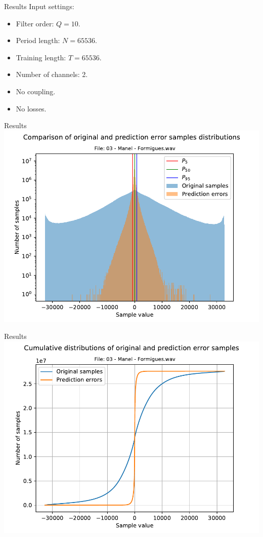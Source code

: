 \documentclass[usenames,dvipsnames]{beamer}
\begin{document}
\begin{frame}{Results}
Input settings:
\begin{itemize}
	\item Filter order: $Q=10$.
	\item Period length: $N=65536$.
	\item Training length: $T=65536$.
	\item Number of channels: 2.
	\item No coupling.
	\item No losses.
\end{itemize}
\end{frame}

\begin{frame}{Results}
\centering
\includegraphics[scale=0.62]{graphics/03 - Manel - Formigues.wav_hist.pdf}
\end{frame}

\begin{frame}{Results}
	\centering
	\includegraphics[scale=0.62]{graphics/03 - Manel - Formigues.wav_hist_cum.pdf}
\end{frame}
\end{document}
